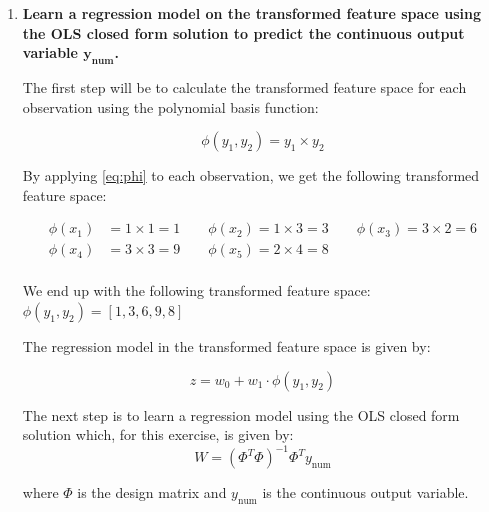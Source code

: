 \documentclass[12pt]{article}
\begin{document}
\begin{enumerate}
    \item \textbf{Learn a regression model on the transformed feature space using the OLS closed form
    solution to predict the continuous output variable $\mathbf{y_{\text{num}}}$.}
    
    \vspace{10pt}
    The first step will be to calculate the transformed feature space for each observation using the polynomial basis function:
    
    \begin{equation}\label{eq:phi}
        \phi(y_1, y_2) = y_1 \times y_2
    \end{equation}

    By applying \eqref{eq:phi} to each observation, we get the following transformed feature space:

    \begin{equation*}
        \begin{aligned}
            \phi(x_1) &= 1 \times 1 = 1 \qquad \phi(x_2) = 1 \times 3 = 3 \qquad \phi(x_3) = 3 \times 2 = 6\\
            \phi(x_4) &= 3 \times 3 = 9 \qquad \phi(x_5) = 2 \times 4 = 8 \\
        \end{aligned}
    \end{equation*}

    \vspace{10pt}
    We end up with the following transformed feature space: $\phi(y_1, y_2) = [1, 3, 6, 9, 8]$
    
    \vspace{10pt}
    The regression model in the transformed feature space is given by:
    
    \begin{equation*}
        z = w_0 + w_1 \cdot \phi(y_1, y_2)
    \end{equation*}

    \vspace{10pt}
    The next step is to learn a regression model using the OLS closed form solution which, for this exercise, is given by:
    \begin{equation*}
        W = (\Phi^T \Phi)^{-1} \Phi^T y_\text{num}
    \end{equation*}

    where $\Phi$ is the design matrix and $y_\text{num}$ is the continuous output variable. 


\end{enumerate}
\end{document}
